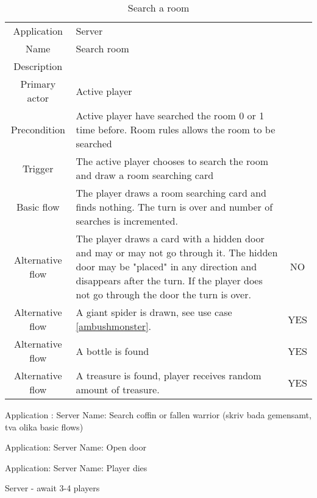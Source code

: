 \documentclass[a4paper,10pt]{report}
\begin{document}
\begin{table}
\caption{Search a room}
\label{searchroom}
\begin{tabular}{|c| p{9cm}|c}
\hline
Application & Server & \\
Name & Search room & \\
Description &  & \\
Primary actor & Active player & \\
Precondition & Active player have searched the room 0 or 1 time before. Room rules allows the room to be searched  & \\
Trigger & The active player chooses to search the room and draw a room searching card  & \\ \hline
Basic flow & The player draws a room searching card and finds nothing. The turn is over and number of searches is incremented. & \\ \hline
Alternative flow & The player draws a card with a hidden door and may or may not go through it. The hidden door may be "placed" in any direction and disappears after the turn. If the player does not go through the door the turn is over. & NO \\\hline
Alternative flow & A giant spider is drawn, see use case \ref{ambushmonster}. & YES \\ \hline
Alternative flow & A bottle is found & YES \\ \hline
Alternative flow & A treasure is found, player receives random amount of treasure. & YES \\
\hline
\end{tabular}
\end{table}

Application : Server
Name: Search coffin or fallen warrior (skriv bada gemensamt, tva olika basic flows)

Application: Server
Name: Open door

Application: Server
Name: Player dies


Server - await 3-4 players
\end{document}
